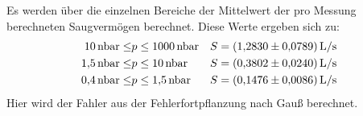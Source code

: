     \noindent Es werden über die einzelnen Bereiche der Mittelwert der pro Messung berechneten Saugvermögen berechnet. Diese Werte ergeben sich zu:
    \begin{align*}
      \SI{10}{\nano\bar} \leq &p \leq \SI{1000}{\nano\bar} & S &= \SI{1.2830 \pm 0.0789}{L\per\second} \\
      \SI{1.5}{\nano\bar} \leq &p \leq \SI{10}{\nano\bar}& S &= \SI{0.3802 \pm 0.0240}{L\per\second} \\
      \SI{0.4}{\nano\bar} \leq &p \leq \SI{1.5}{\nano\bar} & S &= \SI{0.1476 \pm 0.0086}{L\per\second}
    \end{align*}
    Hier wird der Fahler aus der Fehlerfortpflanzung nach Gauß berechnet. 